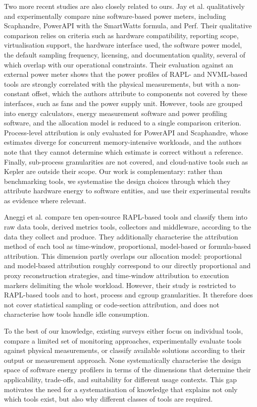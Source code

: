 \documentclass[
  acmsmall,
  screen,
  review,
  xcolor={dvipsnames,usenames}
]{acmart}
\begin{document}
Two more recent studies are also closely related to ours. Jay et al. \cite{jayExperimentalComparisonSoftwarebased2023} qualitatively and experimentally compare nine software-based power meters, including Scaphandre, PowerAPI with the SmartWatts formula, and Perf. Their qualitative comparison relies on criteria such as hardware compatibility, reporting scope, virtualisation support, the hardware interface used, the software power model, the default sampling frequency, licensing, and documentation quality, several of which overlap with our operational constraints. Their evaluation against an external power meter shows that the power profiles of RAPL- and NVML-based tools are strongly correlated with the physical measurements, but with a non-constant offset, which the authors attribute to components not covered by these interfaces, such as fans and the power supply unit. However, tools are grouped into energy calculators, energy measurement software and power profiling software, and the allocation model is reduced to a single comparison criterion. Process-level attribution is only evaluated for PowerAPI and Scaphandre, whose estimates diverge for concurrent memory-intensive workloads, and the authors note that they cannot determine which estimate is correct without a reference. Finally, sub-process granularities are not covered, and cloud-native tools such as Kepler are outside their scope. Our work is complementary: rather than benchmarking tools, we systematise the design choices through which they attribute hardware energy to software entities, and use their experimental results as evidence where relevant.

Aneggi et al. \cite{aneggiMeasuringSoftwareEnergy2026} compare ten open-source RAPL-based tools and classify them into raw data tools, derived metrics tools, collectors and middleware, according to the data they collect and produce. They additionally characterise the attribution method of each tool as time-window, proportional, model-based or formula-based attribution. This dimension partly overlaps our allocation model: proportional and model-based attribution roughly correspond to our directly proportional and proxy reconstruction strategies, and time-window attribution to execution markers delimiting the whole workload. However, their study is restricted to RAPL-based tools and to host, process and cgroup granularities. It therefore does not cover statistical sampling or code-section attribution, and does not characterise how tools handle idle consumption.

To the best of our knowledge, existing surveys either focus on individual tools, compare a limited set of monitoring approaches, experimentally evaluate tools against physical measurements, or classify available solutions according to their output or measurement approach. None systematically characterise the design space of software energy profilers in terms of the dimensions that determine their applicability, trade-offs, and suitability for different usage contexts. This gap motivates the need for a systematisation of knowledge that explains not only which tools exist, but also why different classes of tools are required.
\end{document}

